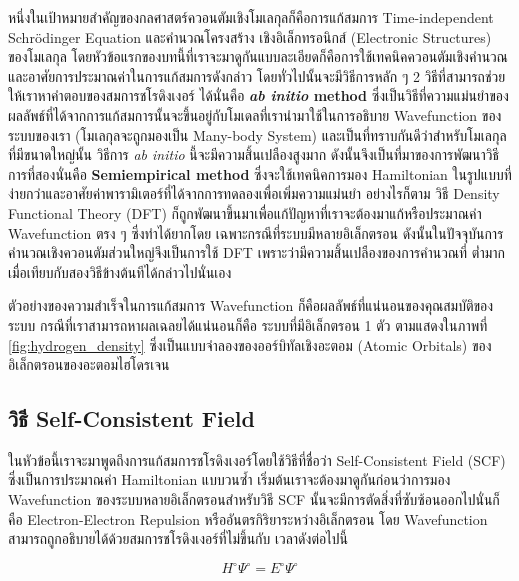 หนึ่งในเป้าหมายสำคัญของกลศาสตร์ควอนตัมเชิงโมเลกุลก็คือการแก้สมการ Time-independent Schr\"{o}dinger Equation และคำนวณโครงสร้าง%
เชิงอิเล็กทรอนิกส์ (Electronic Structures) ของโมเลกุล โดยหัวข้อแรกของบทนี้ที่เราจะมาดูกันแบบละเอียดก็คือการใช้เทคนิคควอนตัมเชิงคำนวณ%
และอาศัยการประมาณค่าในการแก้สมการดังกล่าว โดยทั่วไปนั้นจะมีวิธีการหลัก ๆ 2 วิธีที่สามารถช่วยให้เราหาคำตอบของสมการชโรดิงเงอร์ ได้นั่นคือ 
\textbf{\textit{ab initio} method} ซึ่งเป็นวิธีที่ความแม่นยำของผลลัพธ์ที่ได้จากการแก้สมการนั้นจะขึ้นอยู่กับโมเดลที่เรานำมาใช้ในการอธิบาย 
Wavefunction ของระบบของเรา (โมเลกุลจะถูกมองเป็น Many-body System) และเป็นที่ทราบกันดีว่าสำหรับโมเลกุลที่มีขนาดใหญ่นั้น วิธีการ 
\textit{ab initio} นี้จะมีความสิ้นเปลืองสูงมาก ดังนั้นจึงเป็นที่มาของการพัฒนาวิธีการที่สองนั่นคือ \textbf{Semiempirical method} 
ซึ่งจะใช้เทคนิคการมอง Hamiltonian ในรูปแบบที่ง่ายกว่าและอาศัยค่าพารามิเตอร์ที่ได้จากการทดลองเพื่อเพิ่มความแม่นยำ อย่างไรก็ตาม วิธี 
Density Functional Theory (DFT) ก็ถูกพัฒนาขึ้นมาเพื่อแก้ปัญหาที่เราจะต้องมาแก้หรือประมาณค่า Wavefunction ตรง ๆ ซึ่งทำได้ยากโดย%
เฉพาะกรณีที่ระบบมีหลายอิเล็กตรอน ดังนั้นในปัจจุบันการคำนวณเชิงควอนตัมส่วนใหญ่จึงเป็นการใช้ DFT เพราะว่ามีความสิ้นเปลืองของการคำนวณที่%
ต่ำมากเมื่อเทียบกับสองวิธีข้างต้นทีได้กล่าวไปนั่นเอง

ตัวอย่างของความสำเร็จในการแก้สมการ Wavefunction ก็คือผลลัพธ์ที่แน่นอนของคุณสมบัติของระบบ กรณีที่เราสามารถหาผลเฉลยได้แน่นอนก็คือ%
ระบบที่มีอิเล็กตรอน 1 ตัว ตามแสดงในภาพที่ \ref{fig:hydrogen_density} ซึ่งเป็นแบบจำลองของออร์บิทัลเชิงอะตอม (Atomic Orbitals) 
ของอิเล็กตรอนของอะตอมไฮโดรเจน

\subsection{วิธี Self-Consistent Field}
\label{ssec:scf}

ในหัวข้อนี้เราจะมาพูดถึงการแก้สมการชโรดิงเงอร์โดยใช้วิธีที่ชื่อว่า Self-Consistent Field (SCF) ซึ่งเป็นการประมาณค่า Hamiltonian 
แบบวนซ้ำ เริ่มต้นเราจะต้องมาดูกันก่อนว่าการมอง Wavefunction ของระบบหลายอิเล็กตรอนสำหรับวิธี SCF นั้นจะมีการตัดสิ่งที่ซับซ้อนออกไปนั่นก็คือ
Electron-Electron Repulsion หรืออันตรกิริยาระหว่างอิเล็กตรอน โดย Wavefunction สามารถถูกอธิบายได้ด้วยสมการชโรดิงเงอร์ที่ไม่ขึ้นกับ%
เวลาดังต่อไปนี้\autocite{cramer2004}

\begin{equation}\label{eq:tise_elec}
    H^{\circ} \Psi^{\circ} = E^{\circ} \Psi^{\circ}
\end{equation}

